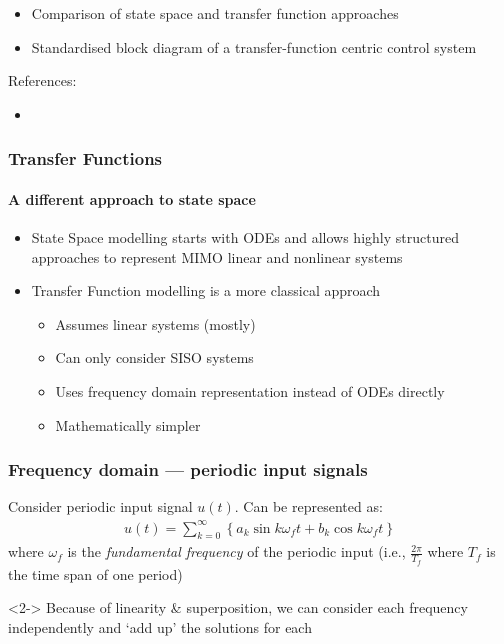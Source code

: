\documentclass[10pt]{beamer-control}
\begin{document}

\begin{SUMMARY}
  \begin{itemize}
    \item Comparison of state space and transfer function approaches
    \item Standardised block diagram of a transfer-function centric control system
  \end{itemize}
  \vfill References:
  \begin{itemize}
    \item \astrom[§9.1]
  \end{itemize}
\end{SUMMARY}


\begin{frame}
  \frametitle{Transfer Functions}
  \framesubtitle{A different approach to state space}

  \begin{itemize}
    \item State Space modelling starts with ODEs and allows highly structured approaches to represent MIMO linear and nonlinear systems
    \item Transfer Function modelling is a more classical approach
      \begin{itemize}
        \item Assumes linear systems (mostly)
        \item Can only consider SISO systems
        \item Uses frequency domain representation instead of ODEs directly
        \item Mathematically simpler
      \end{itemize}
  \end{itemize}

\end{frame}

\begin{frame}
  \frametitle{Frequency domain --- periodic input signals}

  Consider periodic input signal $u(t)$. Can be represented as:
  \begin{align}
    u(t) = \sum_{k=0}^\infty\left\{ a_k \sin k\omega_f t + b_k \cos k \omega_f t \right\}
  \end{align}
  where $\omega_f$ is the \emph{fundamental frequency} of the periodic input (i.e., $\tfrac{2\pi}{T_f}$ where $T_f$ is the time span of one period)

  \bigskip
  \begin{uncoverenv}<2->
    \alert{Because of linearity \& superposition, we can consider each frequency independently and `add up' the solutions for each}
  \end{uncoverenv}
\end{frame}
\end{document}

